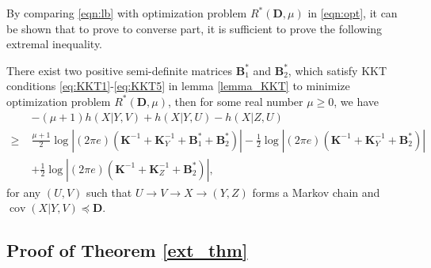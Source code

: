 \documentclass[journal,final, onecolumn]{IEEEtran}
\DeclareMathOperator{\cov}{cov}
\begin{document}
By comparing \eqref{eqn:lb} with optimization problem $R^{*}({\boldsymbol{D}}, \mu)$ in \eqref{eqn:opt}, it can be shown that to prove to converse part, it is sufficient to prove the following extremal inequality.

\begin{theorem} \label{ext_thm}
There exist two positive semi-definite matrices $\boldsymbol{B}_{1}^{*}$ and $\boldsymbol{B}_{2}^{*}$, which satisfy KKT conditions \eqref{eq:KKT1}-\eqref{eq:KKT5} in lemma \ref{lemma_KKT} to minimize optimization problem $R^{*}({\boldsymbol{D}}, \mu)$, then for some real number $\mu \geq 0$, we have
\begin{align}
&-(\mu+1)h(X|Y,V)+h(X|Y,U)-h(X|Z,U) \nonumber \\
\geq \;& \frac{\mu+1}{2} \log \left| (2\pi e)\left( \boldsymbol{K}^{-1} + \boldsymbol{K}^{-1}_{Y} + \boldsymbol{B}^{*}_{1}+\boldsymbol{B}^{*}_{2}\right) \right|-\frac{1}{2} \log \left|(2 \pi e)\left(\boldsymbol{K}^{-1} + \boldsymbol{K}^{-1}_{Y} +\boldsymbol{B}^{*}_{2}\right) \right|  \nonumber \\
&+\frac{1}{2} \log \left|(2 \pi e)\left(\boldsymbol{K}^{-1} + \boldsymbol{K}^{-1}_{Z} +\boldsymbol{B}^{*}_{2}\right) \right|, \label{eq:exinq}
\end{align}
for any $(U,V)$ such that $U \rightarrow V \rightarrow {X} \rightarrow ({Y}, {Z})$ forms a Markov chain and $\cov ({X} | {Y},V) \preceq  {\boldsymbol{D}}$.
\end{theorem}


\subsection {Proof of Theorem \ref{ext_thm}}
\end{document}
